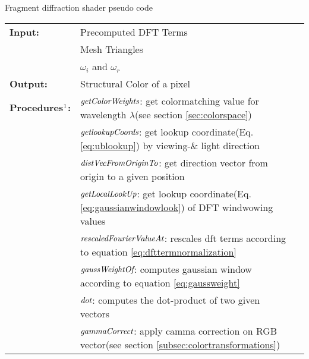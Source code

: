 \begin{algorithm}[H]
  \caption{Fragment diffraction shader pseudo code}
  \begin{table}[H]
    \begin{tabular}{@{}lll@{}}
      \textbf{Input:} & Precomputed DFT Terms  \\
      & Mesh Triangles  \\
      & $\omega_i$ and $\omega_r$  \\
      \textbf{Output:} & Structural Color of a pixel \\
      \textbf{Procedures$\footnotemark$:} & $\emph{getColorWeights}$: get colormatching value for wavelength $\lambda$(see section \ref{sec:colorspace})\\
      & $\emph{getlookupCoords}$: get lookup coordinate(Eq.\ref{eq:ublookup}) by viewing-\& light direction \\
      & $\emph{distVecFromOriginTo}$: get direction vector from origin to a given position \\
      & $\emph{getLocalLookUp}$: get lookup coordinate(Eq.\ref{eq:gaussianwindowlook}) of DFT windwowing values \\
      & $\emph{rescaledFourierValueAt}$: rescales dft terms according to equation \ref{eq:dfttermnormalization}\\
      & $\emph{gaussWeightOf}$: computes gaussian window according to equation \ref{eq:gaussweight} \\
      & $\emph{dot}$: computes the dot-product of two given vectors \\
      & $\emph{gammaCorrect}$: apply camma correction on RGB vector(see section \ref{subsec:colortransformations}) \\  
    \end{tabular} 
  \end{table}
  

\end{algorithm}
